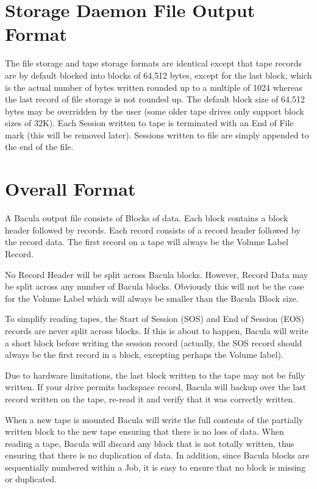 \section{Storage Daemon File Output Format}

The file storage and tape storage formats are identical except that tape
records are by default blocked into blocks of 64,512 bytes, except for the
last block, which is the actual number of bytes written rounded up to a
multiple of 1024 whereas the last record of file storage is not rounded up.
The default block size of 64,512 bytes may be overridden by the user (some
older tape drives only support block sizes of 32K). Each Session written to
tape is terminated with an End of File mark (this will be removed later).
Sessions written to file are simply appended to the end of the file.

\section{Overall Format}

A Bacula output file consists of Blocks of data. Each block contains a block
header followed by records. Each record consists of a record header followed
by the record data. The first record on a tape will always be the Volume Label
Record.

No Record Header will be split across Bacula blocks. However, Record Data may
be split across any number of Bacula blocks. Obviously this will not be the
case for the Volume Label which will always be smaller than the Bacula Block
size.

To simplify reading tapes, the Start of Session (SOS) and End of Session (EOS)
records are never split across blocks. If this is about to happen, Bacula will
write a short block before writing the session record (actually, the SOS
record should always be the first record in a block, excepting perhaps the
Volume label).

Due to hardware limitations, the last block written to the tape may not be
fully written. If your drive permits backspace record, Bacula will backup over
the last record written on the tape, re-read it and verify that it was
correctly written.

When a new tape is mounted Bacula will write the full contents of the
partially written block to the new tape ensuring that there is no loss of
data. When reading a tape, Bacula will discard any block that is not totally
written, thus ensuring that there is no duplication of data. In addition,
since Bacula blocks are sequentially numbered within a Job, it is easy to
ensure that no block is missing or duplicated.

